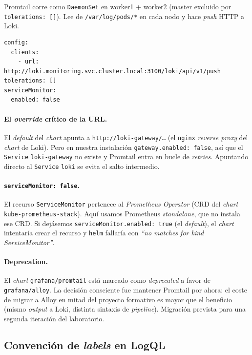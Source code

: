 Promtail corre como \texttt{DaemonSet} en worker1 + worker2 (master excluido por \texttt{tolerations: []}). Lee de \texttt{/var/log/pods/*} en cada nodo y hace \emph{push} HTTP a Loki.

\begin{lstlisting}[style=yaml]
config:
  clients:
    - url: http://loki.monitoring.svc.cluster.local:3100/loki/api/v1/push
tolerations: []
serviceMonitor:
  enabled: false
\end{lstlisting}

\paragraph{El \emph{override} crítico de la URL.} El \emph{default} del \emph{chart} apunta a \texttt{http://loki-gateway/\dots} (el \texttt{nginx} \emph{reverse proxy} del \emph{chart} de Loki). Pero en nuestra instalación \texttt{gateway.enabled: false}, así que el \texttt{Service} \texttt{loki-gateway} no existe y Promtail entra en bucle de \emph{retries}. Apuntando directo al \texttt{Service} \texttt{loki} se evita el salto intermedio.

\paragraph{\texttt{serviceMonitor: false}.} El recurso \texttt{ServiceMonitor} pertenece al \emph{Prometheus Operator} (CRD del \emph{chart} \texttt{kube-prometheus-stack}). Aquí usamos Prometheus \emph{standalone}, que no instala ese CRD. Si dejásemos \texttt{serviceMonitor.enabled: true} (el \emph{default}), el \emph{chart} intentaría crear el recurso y \texttt{helm} fallaría con \emph{``no matches for kind ServiceMonitor''}.

\paragraph{Deprecation.} El \emph{chart} \texttt{grafana/promtail} está marcado como \emph{deprecated} a favor de \texttt{grafana/alloy}. La decisión consciente fue mantener Promtail por ahora: el coste de migrar a Alloy en mitad del proyecto formativo es mayor que el beneficio (mismo \emph{output} a Loki, distinta sintaxis de \emph{pipeline}). Migración prevista para una segunda iteración del laboratorio.

\subsection{Convención de \emph{labels} en LogQL}

